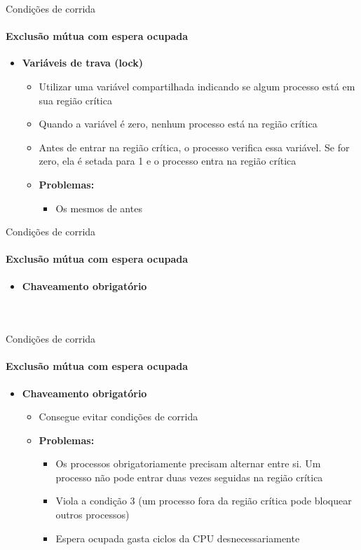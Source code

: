 \documentclass{beamer}
\begin{document}
\begin{frame}{Condições de corrida}
	\framesubtitle{Exclusão mútua com espera ocupada}
	\begin{itemize}
		\item \textbf{Variáveis de trava (lock)}
		\begin{itemize}
			\item Utilizar uma variável compartilhada indicando se algum processo está em sua região crítica
			\item Quando a variável é zero, nenhum processo está na região crítica
			\item Antes de entrar na região crítica, o processo verifica essa variável. Se for zero, ela é setada para 1 e o processo entra na região crítica\pause
			\item \textbf{Problemas:}
			\begin{itemize}
				\item Os mesmos de antes
			\end{itemize}
		\end{itemize}
	\end{itemize}
\end{frame}
\begin{frame}{Condições de corrida}
	\framesubtitle{Exclusão mútua com espera ocupada}
	\begin{itemize}
		\item \textbf{Chaveamento obrigatório}
		\begin{columns}
			\begin{column}{0.5\textwidth}
				\inputminted{c}{resources/strictalternation1.c}
			\end{column}
			\begin{column}{0.5\textwidth}
				\inputminted{c}{resources/strictalternation2.c}
			\end{column}
		\end{columns}
	\end{itemize}
\end{frame}
\begin{frame}{Condições de corrida}
	\framesubtitle{Exclusão mútua com espera ocupada}
	\begin{itemize}
		\item \textbf{Chaveamento obrigatório}
		\begin{itemize}
			\item Consegue evitar condições de corrida\pause
			\item \textbf{Problemas:}
			\begin{itemize}
				\item Os processos obrigatoriamente precisam alternar entre si. Um processo não pode entrar duas vezes seguidas na região crítica
				\item Viola a condição 3 (um processo fora da região crítica pode bloquear outros processos)
				\item Espera ocupada gasta ciclos da CPU desnecessariamente
			\end{itemize}
		\end{itemize}
	\end{itemize}
\end{frame}
\end{document}
